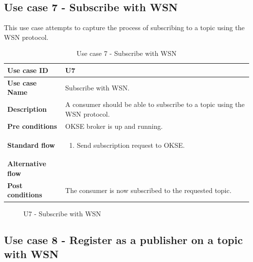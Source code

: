 \subsection{Use case 7 - Subscribe with WSN}
\label{subsec:requirements_engineering-use_cases-sub_wsn}

This use case attempts to capture the process of subscribing to a topic using the WSN protocol. 

\begin{table}[ht!]
\centering
\begin{tabular}{|l|p{5cm}|}
\hline
\textbf{Use case ID} & U7 \\ \hline
\textbf{Use case Name} & Subscribe with WSN. \\ \hline
\textbf{Description} & A consumer should be able to subscribe to a topic using the WSN protocol.  \\ \hline
\textbf{Pre conditions} & OKSE broker is up and running. \\ \hline
\textbf{Standard flow} & \begin{enumerate}
\item Send subscription request to OKSE.
\end{enumerate} \\ \hline
\textbf{Alternative flow} & \\ \hline
\textbf{Post conditions} & The consumer is now subscribed to the requested topic.  \\ \hline
\end{tabular}
\caption{Use case 7 - Subscribe with WSN}
\label{uc7}
\end{table}

\begin{center}
  \begin{figure}[ht!]
    \caption{U7 - Subscribe with WSN}
    \label{fig:u7}
  \end{figure}
\end{center}
\clearpage

\subsection{Use case 8 - Register as a publisher on a topic with WSN}
\label{subsec:requirements_engineering-use_cases-reg_pub_wsn}

